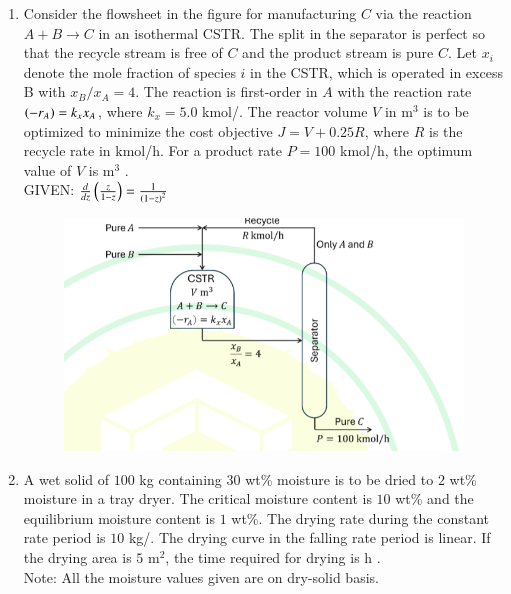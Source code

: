 \documentclass[journal,12pt,onecolumn]{IEEEtran}
\theoremstyle{remark}
\begin{document}
\begin{enumerate}
		\item Consider the flowsheet in the figure for manufacturing $C$ via the reaction $A + B \longrightarrow C$ in an isothermal CSTR. The split in the separator is perfect so that the recycle stream is free of $C$ and the product stream is pure $C$. Let $x_i$ denote the mole fraction of species $i$  in the CSTR, which is operated in excess B with $x_B/x_A = 4$. The reaction is first-order in $A$ with the reaction rate $\left(-r_A\right) = k_x x_A$, where $k_x = 5.0$ kmol/. The reactor volume $V$ in m$^3$ is to be optimized to minimize the cost objective $J = V + 0.25R$, where $R$ is the recycle rate in kmol/h. For a product rate $P = 100$ kmol/h, the optimum value of $V$ is \underline{\hspace{2cm}} m$^3$ . \\
		GIVEN: $\frac{d}{dz}\left(\frac{z}{1-z}\right) = \frac{1}{\left(1-z\right)^2}$
		\begin{figure}[h]
			\centering
			\includegraphics[width=0.6\columnwidth]{q64.png}
			\caption*{}
			\label{fig:q64}
		\end{figure}
		
		\hfill{}
		
		\item A wet solid of $100$ kg containing $30$ wt\% moisture is to be dried to $2$ wt\% moisture in a tray dryer. The critical moisture content is $10$ wt\% and the equilibrium moisture content is $1$ wt\%. The drying rate during the constant rate period is $10$ kg/. The drying curve in the falling rate period is linear. If the drying area is $5$ m$^2$, the time required for drying is \underline{\hspace{2cm}} h . \\
		Note: All the moisture values given are on dry-solid basis.
		
		\hfill{}
	\end{enumerate}
	
\end{document}
